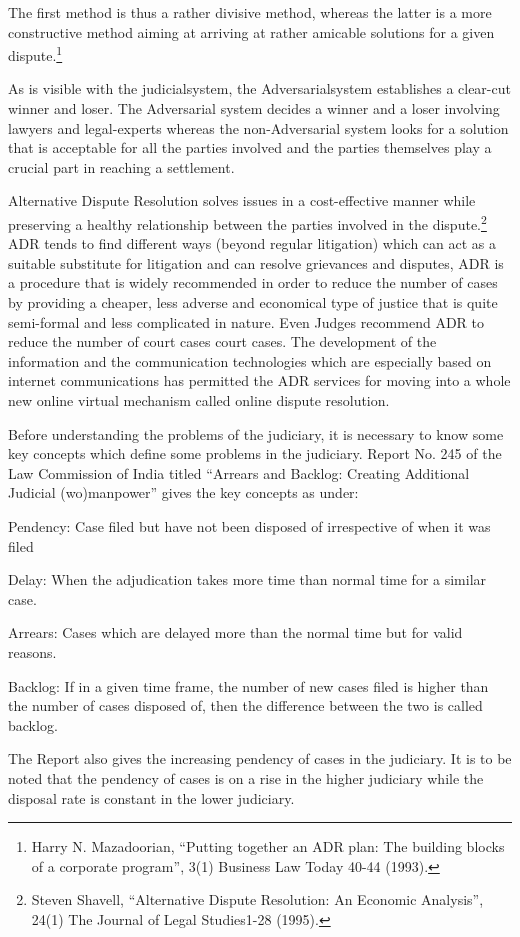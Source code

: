 \begin{multicols}{2}
\noi
The first method is thus a rather divisive method, whereas the latter is a more constructive
method aiming at arriving at rather amicable solutions for a given dispute.\footnote{ Harry N. Mazadoorian, “Putting together an ADR plan: The building blocks of a corporate program”, 3(1)
Business Law Today 40-44 (1993).}

\noi
As is visible with the judicialsystem, the Adversarialsystem establishes a clear-cut winner and
loser. The Adversarial system decides a winner and a loser involving lawyers and legal-experts
whereas the non-Adversarial system looks for a solution that is acceptable for all the parties
involved and the parties themselves play a crucial part in reaching a settlement.

\noi
Alternative Dispute Resolution solves issues in a cost-effective manner while preserving a
healthy relationship between the parties involved in the dispute.\footnote{Steven Shavell, “Alternative Dispute Resolution: An Economic Analysis”, 24(1) The Journal of Legal Studies1-28 (1995).} ADR tends to find different ways (beyond regular litigation) which can act as a suitable substitute for litigation and can resolve grievances and disputes, ADR is a procedure that is widely recommended in order to
reduce the number of cases by providing a cheaper, less adverse and economical type of justice
that is quite semi-formal and less complicated in nature. Even Judges recommend ADR to
reduce the number of court cases court cases. The development of the information and the
communication technologies which are especially based on internet communications has
permitted the ADR services for moving into a whole new online virtual mechanism called
online dispute resolution.


\noi
Before understanding the problems of the judiciary, it is necessary to know some key concepts
which define some problems in the judiciary. Report No. 245 of the Law Commission of India
titled “Arrears and Backlog: Creating Additional Judicial (wo)manpower” gives the key
concepts as under:

\noi
Pendency: Case filed but have not been disposed of irrespective of when it was filed

\noi
Delay: When the adjudication takes more time than normal time for a similar case.

\noi
Arrears: Cases which are delayed more than the normal time but for valid reasons.

\noi
Backlog: If in a given time frame, the number of new cases filed is higher than the number of
cases disposed of, then the difference between the two is called backlog.

\noi
The Report also gives the increasing pendency of cases in the judiciary. It is to be noted that
the pendency of cases is on a rise in the higher judiciary while the disposal rate is constant in
the lower judiciary.
\end{multicols}

